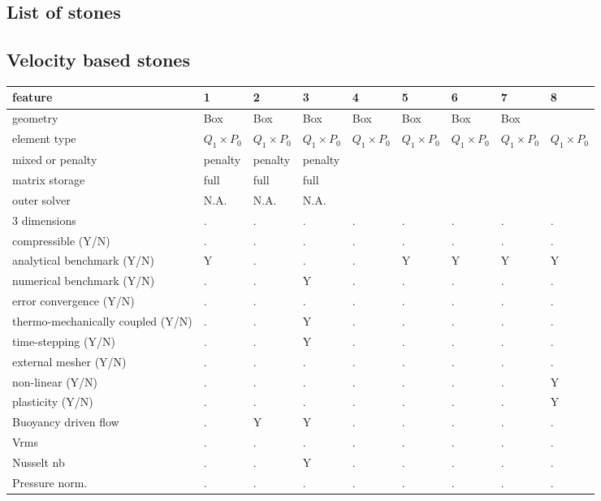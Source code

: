 



\begin{landscape}
\section{List of stones} %

\subsection{Velocity based stones}

{\tiny
\begin{tabular}{|l|p{2cm}|p{2cm}|p{2cm}|p{2cm}|p{2cm}|p{2cm}|p{2cm}|p{2cm}|} 
\hline
feature & 1 &2& 3& 4& 5& 6& 7& 8  \\
\hline
geometry & Box &Box&Box&Box&Box& Box&Box & \\
element type & $Q_1\times P_0$ &$Q_1\times P_0$ &$Q_1\times P_0$ &$Q_1\times P_0$ &$Q_1\times P_0$ &$Q_1\times P_0$ &$Q_1\times P_0$ &$Q_1\times P_0$   \\ 
mixed or penalty  & penalty& penalty& penalty&&&&& \\
matrix storage & full& full& full &&&&& \\
outer solver & N.A.  & N.A. & N.A.&&&&& \\
\hline
3 dimensions & . &.&.&.&.&.&.&. \\
compressible (Y/N) &.&.&.&.&.&.&.&. \\
analytical benchmark (Y/N) & Y &.&.&.&Y&Y&Y&Y \\
numerical benchmark (Y/N) & . &.& Y&.&.&.&.&. \\
error convergence (Y/N) &. &.&.&.&.&.&.&. \\
thermo-mechanically coupled (Y/N) &.&.&Y&.&.&.&.&. \\
time-stepping (Y/N) &.&.&Y&.&.&.&.&. \\
external mesher (Y/N) &.&.&.&.&.&.&.&. \\
non-linear (Y/N) &.&.&.&.&.&.&.&Y \\
plasticity (Y/N) & . &.  &.&.&.&.&.&Y\\ 
Buoyancy driven flow & . & Y &Y &.&.&.&.&.\\
Vrms  & . &.  &. &.&.&.&.&.\\
Nusselt nb  & . & . &Y &.&.&.&.&.\\
Pressure norm. &.&.&.&.&.&.&.&. \\

\end{tabular}}
\end{landscape}
